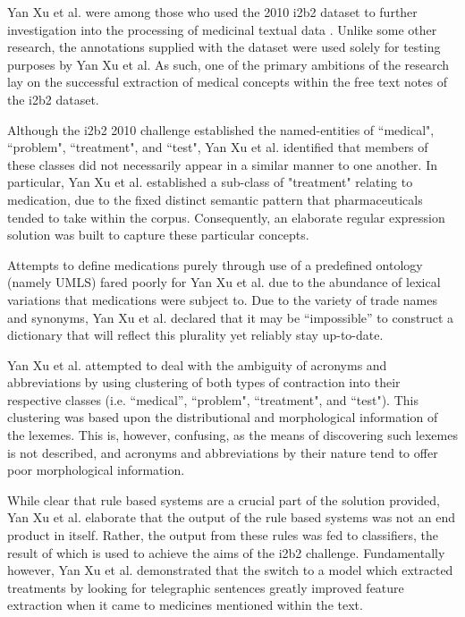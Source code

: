 Yan Xu et al. were among those who used the 2010 i2b2 dataset to further investigation into the processing of medicinal textual data \cite{xu2012named}. Unlike some other research, the annotations supplied with the dataset were used solely for testing purposes by Yan Xu et al. As such, one of the primary ambitions of the research lay on the successful extraction of medical concepts within the free text notes of the i2b2 dataset. 

Although the i2b2 2010 challenge established the named-entities of ``medical", ``problem", ``treatment", and ``test", Yan Xu et al. identified that members of these classes did not necessarily appear in a similar manner to one another. In particular, Yan Xu et al. established a sub-class of "treatment" relating to medication, due to the fixed distinct semantic pattern that pharmaceuticals tended to take within the corpus. Consequently, an elaborate regular expression solution was built to capture these particular concepts.    

Attempts to define medications purely through use of a predefined ontology (namely UMLS) fared poorly for Yan Xu et al. due to the abundance of lexical variations that medications were subject to. Due to the variety of trade names and synonyms, Yan Xu et al. declared that it may be ``impossible'' to construct a dictionary that will reflect this plurality yet reliably stay up-to-date. 

Yan Xu et al. attempted to deal with the ambiguity of acronyms and abbreviations by using clustering of both types of contraction into their respective classes (i.e. ``medical'', ``problem", ``treatment", and ``test"). This clustering was based upon the distributional and morphological information of the lexemes. This is, however, confusing, as the means of discovering such lexemes is not described, and acronyms and abbreviations by their nature tend to offer poor morphological information.  

While clear that rule based systems are a crucial part of the solution provided, Yan Xu et al. elaborate that the output of the rule based systems was not an end product in itself. Rather, the output from these rules was fed to classifiers, the result of which is used to achieve the aims of the i2b2 challenge. Fundamentally however, Yan Xu et al. demonstrated that the switch to a model which extracted treatments by looking for telegraphic sentences greatly improved feature extraction when it came to medicines mentioned within the text.


